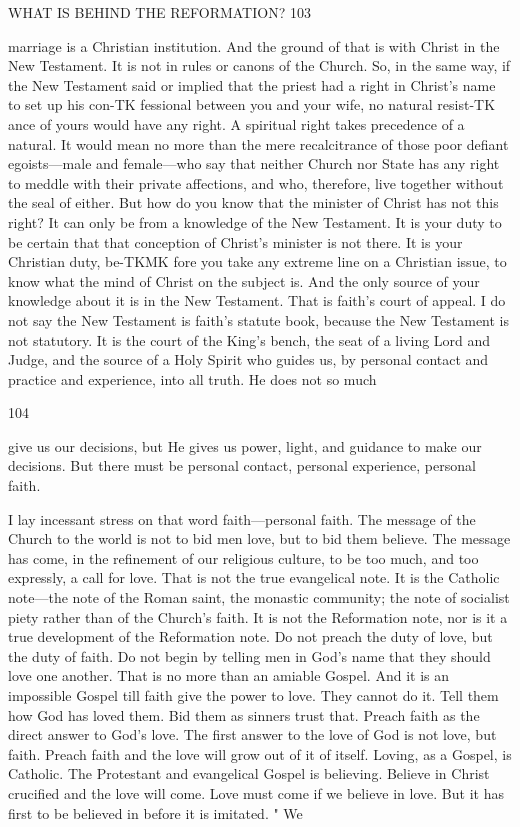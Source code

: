 \documentclass[12pt,a5paper,twoside]{book}
\begin{document}
WHAT IS BEHIND THE REFORMATION? 103 

marriage is a Christian institution. And the ground 
of that is with Christ in the New Testament. It is 
not in rules or canons of the Church. So, in the same 
way, if the New Testament said or implied that the 
priest had a right in Christ's name to set up his con-TK
fessional between you and your wife, no natural resist-TK
ance of yours would have any right. A spiritual right 
takes precedence of a natural. It would mean no 
more than the mere recalcitrance of those poor defiant 
egoists---male and female---who say that neither Church 
nor State has any right to meddle with their private 
affections, and who, therefore, live together without 
the seal of either. But how do you know that the 
minister of Christ has not this right? It can only be 
from a knowledge of the New Testament. It is your 
duty to be certain that that conception of Christ's 
minister is not there. It is your Christian duty, be-TKMK 
fore you take any extreme line on a Christian issue, to 
know what the mind of Christ on the subject is. 
And the only source of your knowledge about it is in 
the New Testament. That is faith's court of appeal. 
I do not say the New Testament is faith's statute 
book, because the New Testament is not statutory. 
It is the court of the King's bench, the seat of a 
living Lord and Judge, and the source of a Holy 
Spirit who guides us, by personal contact and practice 
and experience, into all truth. He does not so much 



104 

give us our decisions, but He gives us power, light, and 
guidance to make our decisions. But there must be 
personal contact, personal experience, personal faith. 

I lay incessant stress on that word faith---personal 
faith. The message of the Church to the world is 
not to bid men love, but to bid them believe. The 
message has come, in the refinement of our religious 
culture, to be too much, and too expressly, a call for 
love. That is not the true evangelical note. It is 
the Catholic note---the note of the Roman saint, the 
monastic community; the note of socialist piety rather 
than of the Church's faith. It is not the Reformation 
note, nor is it a true development of the Reformation 
note. Do not preach the duty of love, but the duty 
of faith. Do not begin by telling men in God's 
name that they should love one another. That is no 
more than an amiable Gospel. And it is an impossible 
Gospel till faith give the power to love. They cannot 
do it. Tell them how God has loved them. Bid 
them as sinners trust that. Preach faith as the direct 
answer to God's love. The first answer to the love of 
God is not love, but faith. Preach faith and the love 
will grow out of it of itself. Loving, as a Gospel, is 
Catholic. The Protestant and evangelical Gospel is 
believing. Believe in Christ crucified and the love will 
come. Love must come if we believe in love. But it 
has first to be believed in before it is imitated. " We 
\end{document}
